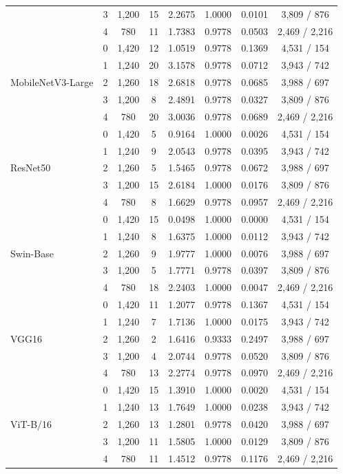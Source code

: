 \documentclass[a4paper,fleqn]{cas-sc}
\begin{document}
\begin{heretable}
\begin{tabular*}{\textwidth}{@{\extracolsep{\fill}}lccccccc@{}}
 & 3 & 1,200 & 15 & 2.2675 & 1.0000 & 0.0101 & 3,809 / 876 \\
 & 4 & 780 & 11 & 1.7383 & 0.9778 & 0.0503 & 2,469 / 2,216 \\
\midrule
\multirow{5}{*}{MobileNetV3-Large} & 0 & 1,420 & 12 & 1.0519 & 0.9778 & 0.1369 & 4,531 / 154 \\
 & 1 & 1,240 & 20 & 3.1578 & 0.9778 & 0.0712 & 3,943 / 742 \\
 & 2 & 1,260 & 18 & 2.6818 & 0.9778 & 0.0685 & 3,988 / 697 \\
 & 3 & 1,200 & 8 & 2.4891 & 0.9778 & 0.0327 & 3,809 / 876 \\
 & 4 & 780 & 20 & 3.0036 & 0.9778 & 0.0689 & 2,469 / 2,216 \\
\midrule
\multirow{5}{*}{ResNet50} & 0 & 1,420 & 5 & 0.9164 & 1.0000 & 0.0026 & 4,531 / 154 \\
 & 1 & 1,240 & 9 & 2.0543 & 0.9778 & 0.0395 & 3,943 / 742 \\
 & 2 & 1,260 & 5 & 1.5465 & 0.9778 & 0.0672 & 3,988 / 697 \\
 & 3 & 1,200 & 15 & 2.6184 & 1.0000 & 0.0176 & 3,809 / 876 \\
 & 4 & 780 & 8 & 1.6629 & 0.9778 & 0.0957 & 2,469 / 2,216 \\
\midrule
\multirow{5}{*}{Swin-Base} & 0 & 1,420 & 15 & 0.0498 & 1.0000 & 0.0000 & 4,531 / 154 \\
 & 1 & 1,240 & 8 & 1.6375 & 1.0000 & 0.0112 & 3,943 / 742 \\
 & 2 & 1,260 & 9 & 1.9777 & 1.0000 & 0.0076 & 3,988 / 697 \\
 & 3 & 1,200 & 5 & 1.7771 & 0.9778 & 0.0397 & 3,809 / 876 \\
 & 4 & 780 & 18 & 2.2403 & 1.0000 & 0.0047 & 2,469 / 2,216 \\
\midrule
\multirow{5}{*}{VGG16} & 0 & 1,420 & 11 & 1.2077 & 0.9778 & 0.1367 & 4,531 / 154 \\
 & 1 & 1,240 & 7 & 1.7136 & 1.0000 & 0.0175 & 3,943 / 742 \\
 & 2 & 1,260 & 2 & 1.6416 & 0.9333 & 0.2497 & 3,988 / 697 \\
 & 3 & 1,200 & 4 & 2.0744 & 0.9778 & 0.0520 & 3,809 / 876 \\
 & 4 & 780 & 13 & 2.2774 & 0.9778 & 0.0970 & 2,469 / 2,216 \\
\midrule
\multirow{5}{*}{ViT-B/16} & 0 & 1,420 & 15 & 1.3910 & 1.0000 & 0.0020 & 4,531 / 154 \\
 & 1 & 1,240 & 13 & 1.7649 & 1.0000 & 0.0238 & 3,943 / 742 \\
 & 2 & 1,260 & 13 & 1.2801 & 0.9778 & 0.0420 & 3,988 / 697 \\
 & 3 & 1,200 & 11 & 1.5805 & 1.0000 & 0.0129 & 3,809 / 876 \\
 & 4 & 780 & 11 & 1.4512 & 0.9778 & 0.1176 & 2,469 / 2,216 \\
\bottomrule
\end{tabular*}
\end{heretable}
\end{document}
